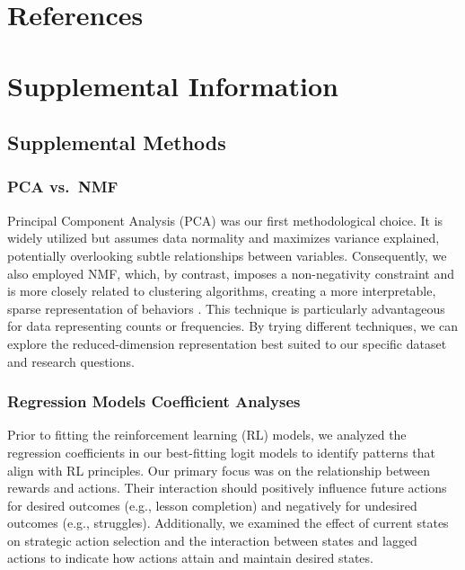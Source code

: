 \documentclass[
  number,
  preprint,
  3p,
  onecolumn]{elsarticle}
\begin{document}
\section{References}\label{references}

\renewcommand{\bibsection}{}


\newpage{}

\section{Supplemental Information}\label{supplemental-information}

\subsection{Supplemental Methods}\label{supplemental-methods}

\subsubsection{PCA vs.~NMF}\label{pca-vs.-nmf}

Principal Component Analysis (PCA) was our first methodological choice.
It is widely utilized but assumes data normality \citep{jolliffe2016}
and maximizes variance explained, potentially overlooking subtle
relationships between variables. Consequently, we also employed NMF,
which, by contrast, imposes a non-negativity constraint and is more
closely related to clustering algorithms, creating a more interpretable,
sparse representation of behaviors \citep{ding2005, lee1999}. This
technique is particularly advantageous for data representing counts or
frequencies. By trying different techniques, we can explore the
reduced-dimension representation best suited to our specific dataset and
research questions.

\subsubsection{Regression Models Coefficient
Analyses}\label{regression-models-coefficient-analyses}

Prior to fitting the reinforcement learning (RL) models, we analyzed the
regression coefficients in our best-fitting logit models to identify
patterns that align with RL principles. Our primary focus was on the
relationship between rewards and actions. Their interaction should
positively influence future actions for desired outcomes (e.g., lesson
completion) and negatively for undesired outcomes (e.g., struggles).
Additionally, we examined the effect of current states on strategic
action selection and the interaction between states and lagged actions
to indicate how actions attain and maintain desired states.
\end{document}
